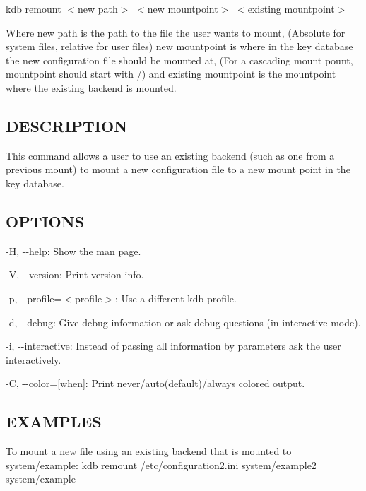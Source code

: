 {\ttfamily kdb remount $<$new path$>$ $<$new mountpoint$>$ $<$existing mountpoint$>$}

Where {\ttfamily new path} is the path to the file the user wants to mount, (Absolute for system files, relative for user files) {\ttfamily new mountpoint} is where in the key database the new configuration file should be mounted at, (For a cascading mount pount, {\ttfamily mountpoint} should start with {\ttfamily /}) and {\ttfamily existing mountpoint} is the mountpoint where the existing backend is mounted.

\subsection*{D\+E\+S\+C\+R\+I\+P\+T\+I\+O\+N}

This command allows a user to use an existing backend (such as one from a previous mount) to mount a new configuration file to a new mount point in the key database.

\subsection*{O\+P\+T\+I\+O\+N\+S}


\begin{DoxyItemize}
\item {\ttfamily -\/\+H}, {\ttfamily -\/-\/help}\+: Show the man page.
\item {\ttfamily -\/\+V}, {\ttfamily -\/-\/version}\+: Print version info.
\item {\ttfamily -\/p}, {\ttfamily -\/-\/profile}=$<$profile$>$\+: Use a different kdb profile.
\item {\ttfamily -\/d}, {\ttfamily -\/-\/debug}\+: Give debug information or ask debug questions (in interactive mode).
\item {\ttfamily -\/i}, {\ttfamily -\/-\/interactive}\+: Instead of passing all information by parameters ask the user interactively.
\item {\ttfamily -\/\+C}, {\ttfamily -\/-\/color}=\mbox{[}when\mbox{]}\+: Print never/auto(default)/always colored output.
\end{DoxyItemize}

\subsection*{E\+X\+A\+M\+P\+L\+E\+S}

To mount a new file using an existing backend that is mounted to {\ttfamily system/example}\+: {\ttfamily kdb remount /etc/configuration2.ini system/example2 system/example} 